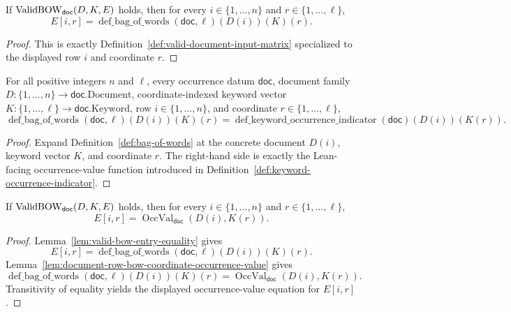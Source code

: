 \begin{lemma}
  \label{lem:valid-bow-entry-equality}
  If $\operatorname{ValidBOW}_{\mathsf{doc}}(D,K,E)$ holds, then for every
  $i\in\{1,\ldots,n\}$ and $r\in\{1,\ldots,\ell\}$,
  \[
    E[i,r]=
      \operatorname{def\_bag\_of\_words}(\mathsf{doc},\ell)(D(i))(K)(r).
  \]
\end{lemma}
\begin{proof}
  This is exactly Definition~\ref{def:valid-document-input-matrix}
  specialized to the displayed row $i$ and coordinate $r$.
\end{proof}

\begin{lemma}
  \label{lem:document-row-bow-coordinate-occurrence-value}
  For all positive integers $n$ and $\ell$, every occurrence datum
  $\mathsf{doc}$, document family
  $D:\{1,\ldots,n\}\to\mathsf{doc}.\mathrm{Document}$,
  coordinate-indexed keyword vector
  $K:\{1,\ldots,\ell\}\to\mathsf{doc}.\mathrm{Keyword}$, row
  $i\in\{1,\ldots,n\}$, and coordinate $r\in\{1,\ldots,\ell\}$,
  \[
    \operatorname{def\_bag\_of\_words}(\mathsf{doc},\ell)(D(i))(K)(r)
      =
      \operatorname{def\_keyword\_occurrence\_indicator}
        (\mathsf{doc})(D(i))(K(r)).
  \]
\end{lemma}
\begin{proof}
  Expand Definition~\ref{def:bag-of-words} at the concrete document $D(i)$,
  keyword vector $K$, and coordinate $r$.  The right-hand side is exactly the
  Lean-facing occurrence-value function introduced in
  Definition~\ref{def:keyword-occurrence-indicator}.
\end{proof}

\begin{lemma}
  \label{lem:valid-bow-entry-occurrence-value}
  If $\operatorname{ValidBOW}_{\mathsf{doc}}(D,K,E)$ holds, then for every
  $i\in\{1,\ldots,n\}$ and $r\in\{1,\ldots,\ell\}$,
  \[
    E[i,r]=\operatorname{OccVal}_{\mathsf{doc}}(D(i),K(r)).
  \]
\end{lemma}
\begin{proof}
  Lemma~\ref{lem:valid-bow-entry-equality} gives
  \[
    E[i,r]=
      \operatorname{def\_bag\_of\_words}(\mathsf{doc},\ell)(D(i))(K)(r).
  \]
  Lemma~\ref{lem:document-row-bow-coordinate-occurrence-value} gives
  \[
    \operatorname{def\_bag\_of\_words}(\mathsf{doc},\ell)(D(i))(K)(r)
      =\operatorname{OccVal}_{\mathsf{doc}}(D(i),K(r)).
  \]
  Transitivity of equality yields the displayed occurrence-value equation for
  $E[i,r]$.
\end{proof}

